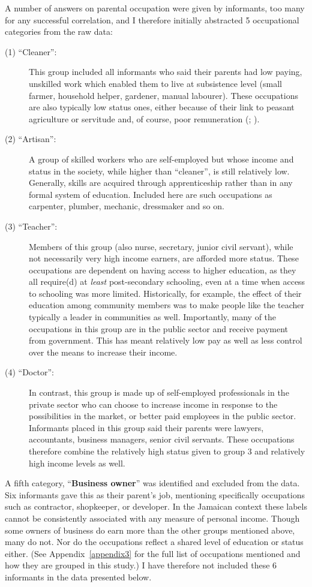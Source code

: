 A number of answers on parental occupation were given by informants, too many for any successful correlation, and I therefore initially abstracted 5 occupational categories from the raw data:

\begin{description}
\item[(1) {“Cleaner”}:] This group included all informants who said their parents had low paying, unskilled work which enabled them to live at subsistence level (small farmer, household helper, gardener, manual labourer).  These occupations are also typically low status ones, either because of their link to peasant agriculture or servitude and, of course, poor remuneration (\citealt[138--140]{Nettleford1970}; \citealt[20]{Stone1980}).
\item[(2) {“Artisan”}:] A group of skilled workers who are self-employed but whose income and status in the society, while higher than “cleaner”, is still relatively low.  Generally, skills are acquired through apprenticeship rather than in any formal system of education.  Included here are such occupations as carpenter, plumber, mechanic, dressmaker and so on.
\item[(3) {“Teacher”}:] Members of this group (also nurse, secretary, junior civil servant), while not necessarily very high income earners, are afforded more status.  These occupations are dependent on having access to higher education, as they all require(d) at \textit{least} post-secondary schooling, even at a time when access to schooling was more limited.  Historically, for example, the effect of their education among community members was to make people like the teacher typically a leader in communities as well.  Importantly, many of the occupations in this group are in the public sector and receive payment from government.  This has meant relatively low pay as well as less control over the means to increase their income.
\item[(4) {“Doctor”}:] In contrast, this group is made up of self-employed professionals in the private sector who can choose to increase income in response to the possibilities in the market, or better paid employees in the public sector.  Informants placed in this group said their parents were lawyers, accountants, business managers, senior civil servants.  These occupations therefore combine the relatively high status given to group 3 and relatively high income levels as well.
\end{description} 

\noindent A fifth category, “\textbf{Business owner}” was identified and excluded from the data.  Six informants gave this as their parent’s job, mentioning specifically occupations such as contractor, shopkeeper, or developer.  In the Jamaican context these labels cannot be consistently associated with any measure of personal income.  Though some owners of business do earn more than the other groups mentioned above, many do not.  Nor do the occupations reflect a shared level of education or status either.  (See Appendix~\ref{appendix3} for the full list of occupations mentioned and how they are grouped in this study.)  I have therefore not included these 6 informants in the data presented below.


